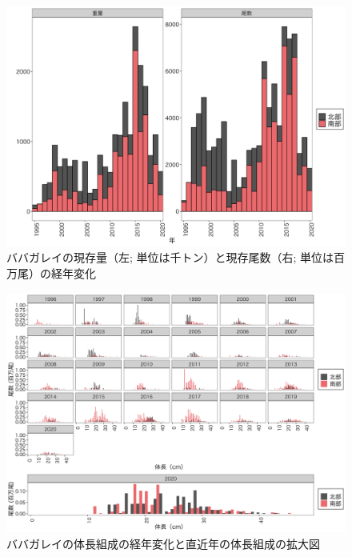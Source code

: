 \documentclass[11pt]{article} %
\begin{document}
\begin{linenumbers}
\begin{figure}[h]
  \centering
  \includegraphics[width = 14cm]{ババガレイtrend.png}
  \caption{ババガレイの現存量（左; 単位は千トン）と現存尾数（右; 単位は百万尾）の経年変化}
\end{figure}

\begin{figure}[h]
  \centering
  \includegraphics[width = 14cm]{ババガレイlength.png}
  \caption{ババガレイの体長組成の経年変化と直近年の体長組成の拡大図}
\end{figure}

\end{linenumbers}
\end{document}

